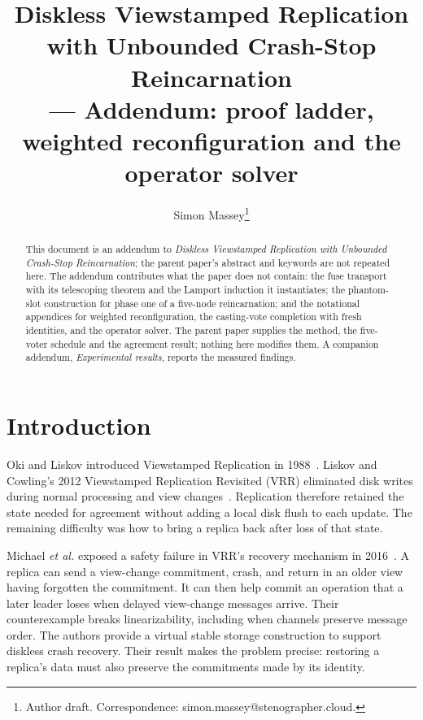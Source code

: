 \documentclass[10pt,journal,letterpaper]{IEEEtran}
\title{Diskless Viewstamped Replication with Unbounded Crash-Stop Reincarnation\\--- Addendum: proof ladder, weighted reconfiguration and the operator solver}
\author{Simon Massey\thanks{Author draft. Correspondence: simon.massey@stenographer.cloud.}}
\begin{document}
\maketitle
\thispagestyle{fancy}

\begin{abstract}
This document is an addendum to \emph{Diskless Viewstamped Replication with
Unbounded Crash-Stop Reincarnation}; the parent paper's abstract and keywords
are not repeated here. The addendum contributes what the paper does not
contain: the fuse transport with its telescoping theorem and the Lamport
induction it instantiates; the phantom-slot construction for phase one of a
five-node reincarnation; and the notational appendices for weighted
reconfiguration, the casting-vote completion with fresh identities, and the
operator solver. The parent paper supplies the method, the five-voter
schedule and the agreement result; nothing here modifies them. A companion
addendum, \emph{Experimental results}, reports the measured findings.
\end{abstract}





\section{Introduction}\label{sec:intro}
Oki and Liskov introduced Viewstamped Replication in 1988~\cite{vr}.
Liskov and Cowling's 2012 Viewstamped Replication Revisited (VRR) eliminated
disk writes during normal processing and view changes~\cite{vrr}.
Replication therefore retained the state needed for agreement without adding a
local disk flush to each update. The remaining difficulty was how to bring a
replica back after loss of that state.

Michael \emph{et al.} exposed a safety failure in VRR's recovery mechanism in
2016~\cite[Sec.~4.2 and Appendix~A.1]{diskless}.
A replica can send a view-change commitment, crash, and return in an older view
having forgotten the commitment.
It can then help commit an operation that a later leader loses when delayed
view-change messages arrive.
Their counterexample breaks linearizability, including when channels preserve
message order.
The authors provide a virtual stable storage construction to support diskless
crash recovery.
Their result makes the problem precise: restoring a replica's data must also
preserve the commitments made by its identity.
\end{document}
